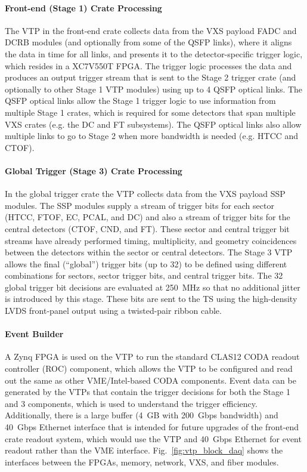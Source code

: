 \paragraph{Front-end (Stage 1) Crate Processing}
The VTP in the front-end crate collects data from the VXS payload FADC and DCRB modules (and optionally from some of the QSFP links), where it aligns the data in time for all links, and presents it to the detector-specific trigger logic, which resides in a XC7V550T FPGA. The trigger logic processes the data and produces an output trigger stream that is sent to the Stage 2 trigger crate (and optionally to other Stage 1 VTP modules) using up to 4 QSFP optical links. The QSFP optical links allow the Stage 1 trigger logic to use information from multiple Stage 1 crates, which is required for some detectors that span multiple VXS crates (e.g. the DC and FT subsystems). The QSFP optical links also allow multiple links to go to Stage 2 when more bandwidth is needed (e.g. HTCC and CTOF).

\paragraph{Global Trigger (Stage 3) Crate Processing}
In the global trigger crate the VTP collects data from the VXS payload SSP modules. The SSP modules supply a stream of trigger bits for each sector (HTCC, FTOF, EC, PCAL, and DC) and also a stream of trigger bits for the central detectors (CTOF, CND, and FT). These sector and central trigger bit streams have already performed timing, multiplicity, and geometry coincidences between the detectors within the sector or central detectors. The Stage 3 VTP allows the final (``global'') trigger bits (up to 32) to be defined using different combinations for sectors, sector trigger bits, and central trigger bits. The 32 global trigger bit decisions are evaluated at 250~MHz so that no additional jitter is introduced by this stage. These bits are sent to the TS using the high-density LVDS front-panel output using a twisted-pair ribbon cable.

\paragraph{Event Builder}
A Zynq FPGA is used on the VTP to run the standard CLAS12 CODA readout controller (ROC) component, which allows the VTP to be configured and read out the same as other VME/Intel-based CODA components. Event data can be generated by the VTPs that contain the trigger decisions for both the Stage 1 and 3 components, which is used to understand the trigger efficiency. Additionally, there is a large buffer (4~GB with 200~Gbps bandwidth) and 40~Gbps Ethernet interface that is intended for future upgrades of the front-end crate readout system, which would use the VTP and 40~Gbps Ethernet for event readout rather than the VME interface. Fig.~\ref{fig:vtp_block_daq} shows the interfaces between the FPGAs, memory, network, VXS, and fiber modules.

